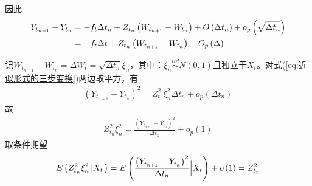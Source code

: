 		因此
		\begin{align}\label{eq:近似形式的三步变换}
		{Y_{{t_{n + 1}}}} - {Y_{{t_n}}} &=  - {f_t}\Delta t_n + {Z_{{t_n}}}\left( {{W_{{t_{n + 1}}}} - {W_{{t_n}}}} \right) + O\left( {\Delta {t_n}} \right) + {o_p}\left( {\sqrt {\Delta {t_n}} } \right)  \notag \\
		  &=  - {f_t}\Delta t + {Z_{{t_n}}}\left( {{W_{{t_{n + 1}}}} - {W_{{t_n}}}} \right)  + {O_p}\left( \Delta  \right)
		\end{align}
		\par
		记${{W_{{t_{n + 1}}}} - {W_{{t_n}}} = \Delta {W_t} = \sqrt {\Delta {t_n}}  {\xi _n}}$，其中：${{\xi _n}\mathop  \sim \limits^{iid} N( 0,1)}$且独立于$X_t$。对式(\ref{eq:近似形式的三步变换})两边取平方，有
		\begin{align*}
		{\left( {{Y_{{t_{n + 1}}}} - {Y_{{t_n}}}} \right)^2} = Z_{{t_n}}^2\xi _n^2\Delta {t_n} + {o_p}\left( {\Delta {t_n}} \right)\end{align*}
		故
		\begin{align*}
		Z_{{t_n}}^2\xi _n^2 = \frac{{{{\left( {{Y_{{t_{n + 1}}}} - {Y_{{t_n}}}} \right)}^2}}}{{\Delta {t_n}}} + {o_p}\left( 1  \right)\end{align*}
		取条件期望
		\begin{align*}
		E\left( {Z_{{t_n}}^2\xi _n^2\left| {{X_t}} \right.} \right) = E\left( {\frac{{{{\left( {{Y_{{t_{n + 1}}}} - {Y_{{t_n}}}} \right)}^2}}}{{\Delta {t_n}}} \Bigl| {{X_t}} } \right) + o\left( 1  \right) = Z_{{t_n}}^2\end{align*}

